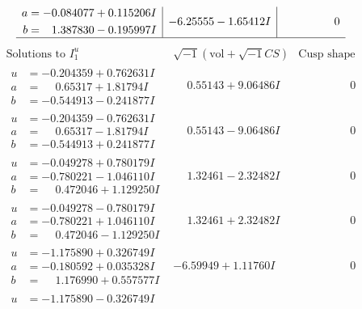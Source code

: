 \documentclass[1p]{elsarticle_modified}
\theoremstyle{definition}
\newcommand{\I}{\sqrt{-1}}
\begin{document}
$$\begin{array}{c|c|c}
\begin{aligned}
a &= -0.084077 + 0.115206 I \\
b &= \phantom{-}1.387830 - 0.195997 I\end{aligned}
 & -6.25555 - 1.65412 I & \phantom{-0.000000 } 0\\
 \hline 
 \end{array}$$\newpage$$\begin{array}{c|c|c}  
\text{Solutions to }I^u_{1}& \I (\text{vol} + \sqrt{-1}CS) & \text{Cusp shape}\\
 \hline 
\begin{aligned}
u &= -0.204359 + 0.762631 I \\
a &= \phantom{-}0.65317 + 1.81794 I \\
b &= -0.544913 - 0.241877 I\end{aligned}
 & \phantom{-}0.55143 + 9.06486 I & \phantom{-0.000000 } 0 \\ \hline\begin{aligned}
u &= -0.204359 - 0.762631 I \\
a &= \phantom{-}0.65317 - 1.81794 I \\
b &= -0.544913 + 0.241877 I\end{aligned}
 & \phantom{-}0.55143 - 9.06486 I & \phantom{-0.000000 } 0 \\ \hline\begin{aligned}
u &= -0.049278 + 0.780179 I \\
a &= -0.780221 - 1.046110 I \\
b &= \phantom{-}0.472046 + 1.129250 I\end{aligned}
 & \phantom{-}1.32461 - 2.32482 I & \phantom{-0.000000 } 0 \\ \hline\begin{aligned}
u &= -0.049278 - 0.780179 I \\
a &= -0.780221 + 1.046110 I \\
b &= \phantom{-}0.472046 - 1.129250 I\end{aligned}
 & \phantom{-}1.32461 + 2.32482 I & \phantom{-0.000000 } 0 \\ \hline\begin{aligned}
u &= -1.175890 + 0.326749 I \\
a &= -0.180592 + 0.035328 I \\
b &= \phantom{-}1.176990 + 0.557577 I\end{aligned}
 & -6.59949 + 1.11760 I & \phantom{-0.000000 } 0 \\ \hline\begin{aligned}
u &= -1.175890 - 0.326749 I \\

\end{aligned}
\end{array}$$
\end{document}
